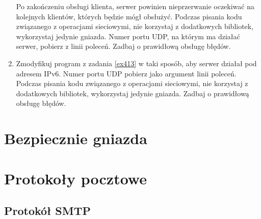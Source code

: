 \documentclass{article}
\begin{document}
\begin{enumerate}[label=\textbf{4.\arabic*}, resume]
\noindent Po zakończeniu obsługi klienta, serwer powinien nieprzerwanie oczekiwać na kolejnych klientów, których będzie mógł obsłużyć. Podczas pisania kodu związanego z operacjami sieciowymi, nie korzystaj z dodatkowych bibliotek, wykorzystaj jedynie gniazda. Numer portu UDP, na którym ma działać serwer, pobierz z linii poleceń. Zadbaj o prawidłową obsługę błędów. 
\item  Zmodyfikuj program z zadania \ref{ex413} w taki sposób,  aby serwer działał pod adresem IPv6.   Numer portu UDP pobierz jako argument linii poleceń. Podczas pisania kodu związanego z operacjami sieciowymi, nie korzystaj z dodatkowych bibliotek, wykorzystaj jedynie gniazda. Zadbaj o prawidłową obsługę błędów.



\end{enumerate}


\newpage
\section{Bezpiecznie gniazda}

\newpage
\section{Protokoły pocztowe}

\subsection*{Protokół SMTP}
\end{document}

